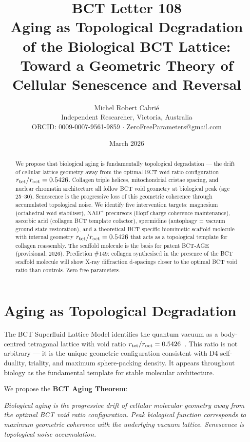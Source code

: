 \documentclass[twocolumn,10pt]{article}
\title{\textbf{BCT Letter 108}\\
Aging as Topological Degradation of the Biological BCT Lattice:\\
Toward a Geometric Theory of Cellular Senescence and Reversal}
\author{Michel Robert Cabri\'{e}\\
\small Independent Researcher, Victoria, Australia\\
\small ORCID: 0009-0007-9561-9859 $\cdot$ ZeroFreeParameters@gmail.com}
\date{March 2026}
\begin{document}
\maketitle

\begin{abstract}
We propose that biological aging is fundamentally topological degradation —
the drift of cellular lattice geometry away from the optimal BCT void ratio
configuration $r_{\rm tet}/r_{\rm oct} = 0.5426$. Collagen triple helices,
mitochondrial cristae spacing, and nuclear chromatin architecture all follow
BCT void geometry at biological peak (age 25--30). Senescence is the
progressive loss of this geometric coherence through accumulated topological
noise. We identify five intervention targets: magnesium (octahedral void
stabiliser), NAD$^+$ precursors (Hopf charge coherence maintenance),
ascorbic acid (collagen BCT template cofactor), spermidine (autophagy =
vacuum ground state restoration), and a theoretical BCT-specific biomimetic
scaffold molecule with internal geometry $r_{\rm tet}/r_{\rm oct} = 0.5426$
that acts as a topological template for collagen reassembly. The scaffold
molecule is the basis for patent BCT-AGE (provisional, 2026).
Prediction \#149: collagen synthesised in the presence of the BCT scaffold
molecule will show X-ray diffraction d-spacings closer to the optimal
BCT void ratio than controls. Zero free parameters.
\end{abstract}

\maketitle

\section{Aging as Topological Degradation}

The BCT Superfluid Lattice Model identifies the quantum vacuum as a
body-centred tetragonal lattice with void ratio
$r_{\rm tet}/r_{\rm oct} = 0.5426$~\cite{bct_l1}. This ratio is not
arbitrary — it is the unique geometric configuration consistent with
D4 self-duality, triality, and maximum sphere-packing density. It appears
throughout biology as the fundamental template for stable molecular
architecture.

We propose the \textbf{BCT Aging Theorem}:

\textit{Biological aging is the progressive drift of cellular molecular
geometry away from the optimal BCT void ratio configuration. Peak
biological function corresponds to maximum geometric coherence with
the underlying vacuum lattice. Senescence is topological noise
accumulation.}
\end{document}
